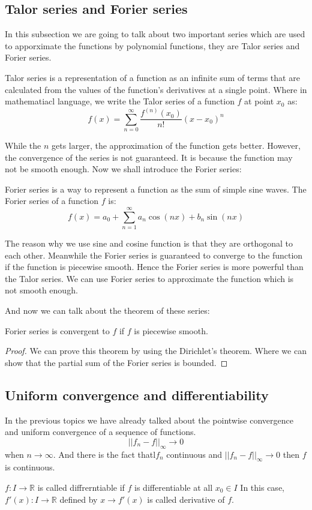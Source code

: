 \documentclass{article}
\newcommand{\R}{\mathbb{R}}
\begin{document}
\subsection{Talor series and Forier series}
In this subsection we are going to talk about two important series which are used to apporximate the functions by polynomial functions,
they are Talor series and Forier series. 
\begin{definition}
Talor series is a representation of a function as an infinite sum of terms that are calculated from the values of the function's derivatives at a single point.
Where in mathematiacl language, we write the Talor series of a function $f$ at point $x_0$ as: 
\begin{equation*}
  f(x)=\sum_{n=0}^\infty \frac{f^{(n)}(x_0)}{n!}(x-x_0)^n
  \end{equation*}
\end{definition}
While the $n$ gets larger, the approximation of the function gets better. However, the convergence of the series is not guaranteed.
It is because the function may not be smooth enough. 
Now we shall introduce the Forier series:
\begin{definition}
  Forier series is a way to represent a function as the sum of simple sine waves. The Forier series of a function $f$ is:
  \begin{equation}
    f(x)=a_0+\sum_{n=1}^\infty a_n\cos(nx)+b_n\sin(nx) 
  \end{equation}
\end{definition}
The reason why we use sine and cosine function is that they are orthogonal to each other.
Meanwhile the Forier series is guaranteed to converge to the function if the function is piecewise smooth.
Hence the Forier series is more powerful than the Talor series.
We can use Forier series to approximate the function which is not smooth enough.

And now we can talk about the theorem of these series:
\begin{theorem}
  Forier series is convergent to $f$ if $f$ is piecewise smooth.
\end{theorem}

\begin{proof}
  We can prove this theorem by using the Dirichlet's theorem.
  Where we can show that the partial sum of the Forier series is bounded.
\end{proof}

\subsection{Uniform convergence and differentiability}
In the previous topics we have already talked about the pointwise convergence and uniform convergence of a sequence of functions.
$$||f_n-f||_\infty \to 0$$ when $n\to \infty$.
And there is the fact thatl$f_n$ continuous and $||f_n-f||_\infty \to 0$ then $f$ is continuous.
\begin{definition}
 $f:I \to \R$ is called diffrerntiable if $f$ is differentiable at all $x_0\in I$
In this case, $f'(x):I \to \R$ defined by $x \to f'(x)$ is called derivative of $f$.
\end{definition}
\end{document}
